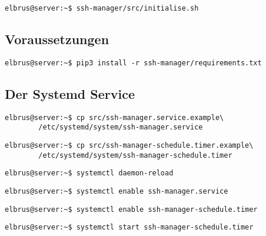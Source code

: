 \documentclass{article}
\begin{document}
	\lstset{style=commands}	
	\begin{lstlisting}[caption={Ausführen des Scripts zur Initialisierung des VCS Verzeichnisses.}]
		elbrus@server:~$ ssh-manager/src/initialise.sh
	\end{lstlisting}
	
	\newpage
	\subsection[dependencies]{Voraussetzungen}
	\begin{lstlisting}[caption={Installieren von fehlenden python3 Packages.}]
		elbrus@server:~$ pip3 install -r ssh-manager/requirements.txt
	\end{lstlisting}

	\subsection[systemd service]{Der Systemd Service}
	\begin{lstlisting}[caption={Kopieren des Serviceprogrammes}]
		elbrus@server:~$ cp src/ssh-manager.service.example\
		/etc/systemd/system/ssh-manager.service
	\end{lstlisting}

	\begin{lstlisting}[caption={Kopieren des Zeitplanungsprogrammes.}]
		elbrus@server:~$ cp src/ssh-manager-schedule.timer.example\
		/etc/systemd/system/ssh-manager-schedule.timer
	\end{lstlisting}

	\begin{lstlisting}[caption={Neuladen des 'systemctl' Deamons}]
		elbrus@server:~$ systemctl daemon-reload
	\end{lstlisting}

	\begin{lstlisting}[caption={Aktivieren des Serviceprogrammes}]
		elbrus@server:~$ systemctl enable ssh-manager.service
	\end{lstlisting}

	\begin{lstlisting}[caption={Aktivieren des Zeitplanungsprogrammes}]
		elbrus@server:~$ systemctl enable ssh-manager-schedule.timer
	\end{lstlisting}

	\begin{lstlisting}[caption={Starten des Zeitplanungsprogrammes}]
		elbrus@server:~$ systemctl start ssh-manager-schedule.timer
	\end{lstlisting}
	\newpage
	
\end{document}

